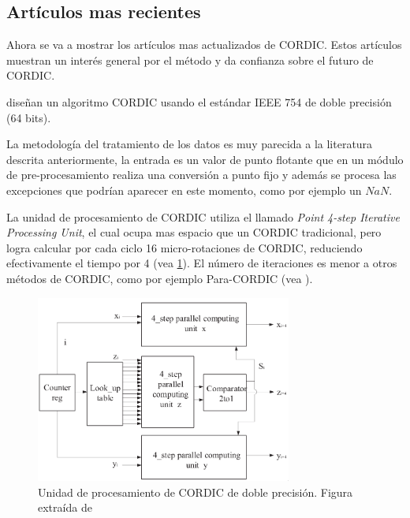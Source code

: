 \subsection{Artículos mas recientes}
Ahora se va a mostrar los artículos mas actualizados de CORDIC. Estos artículos muestran un interés general por el método y da confianza sobre el futuro de CORDIC.

\cite{hou_low_2019} diseñan un algoritmo CORDIC usando el estándar IEEE 754 de doble precisión (64 bits).

La metodología del tratamiento de los datos es muy parecida a la literatura descrita anteriormente, la entrada es un valor de punto flotante que en un módulo de pre-procesamiento realiza una conversión a punto fijo y además se procesa las excepciones que podrían aparecer en este momento, como por ejemplo un $NaN$.

La unidad de procesamiento de CORDIC utiliza el llamado \textit{Point 4-step Iterative Processing Unit}, el cual ocupa mas espacio que un CORDIC tradicional, pero logra calcular por cada ciclo 16 micro-rotaciones de CORDIC, reduciendo efectivamente el tiempo por 4 (vea \ref{graf:2019_4-step-64bit}). El número de iteraciones es menor a otros métodos de CORDIC, como por ejemplo Para-CORDIC (vea \cite{tso-bing_juang_para-cordic_2004}).

\begin{figure}[ht]
	\centering
	\includegraphics[width=0.75\textwidth]{archivos/CORDIC/2019_4-step-64bit.png}
	\caption{Unidad de procesamiento de CORDIC de doble precisión. Figura extraída de \cite{yeshwanth_high-speed_2018}}
	\label{graf:2019_4-step-64bit}
\end{figure}

\begin{table}[]
	\centering
	\caption{Número de iteraciones comparando el multiplicador CORDIC con punto flotante de \cite{yeshwanth_high-speed_2018} a otras soluciones.}
	\label{table:2019_4-step-comp-64bit}
\end{table}

